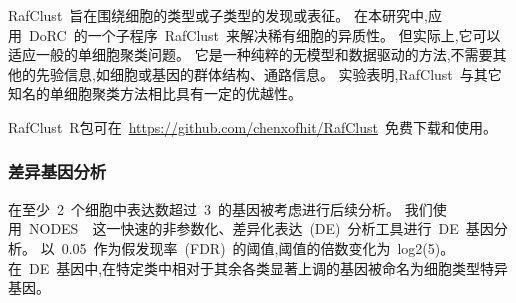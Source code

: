 RafClust~旨在围绕细胞的类型或子类型的发现或表征。
在本研究中,应用~DoRC~的一个子程序~RafClust~来解决稀有细胞的异质性。
但实际上,它可以适应一般的单细胞聚类问题。
它是一种纯粹的无模型和数据驱动的方法,不需要其他的先验信息,如细胞或基因的群体结构、通路信息。
实验表明,RafClust~与其它知名的单细胞聚类方法相比具有一定的优越性。

RafClust~R包可在~\url{https://github.com/chenxofhit/RafClust}~免费下载和使用。

\subsubsection{差异基因分析}
\label{subsec:de}
在至少~2~个细胞中表达数超过~3~的基因被考虑进行后续分析。
我们使用~NODES~\cite{Sengupta049734}~这一快速的非参数化、差异化表达~(DE)~分析工具进行~DE~基因分析。
以~0.05~作为假发现率~(FDR)~的阈值,阈值的倍数变化为~log2(5)。
在~DE~基因中,在特定类中相对于其余各类显著上调的基因被命名为细胞类型特异基因。

